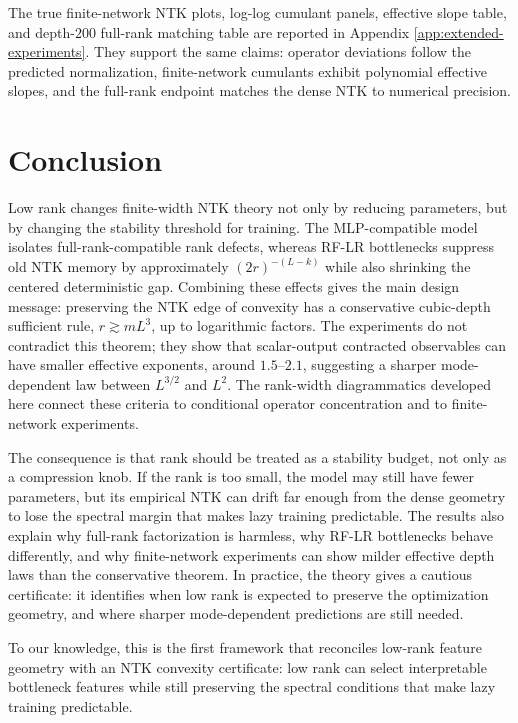 \documentclass{article}
\begin{document}
The true finite-network NTK plots, log-log cumulant panels, effective slope table, and depth-\(200\) full-rank matching table are reported in Appendix \ref{app:extended-experiments}. They support the same claims: operator deviations follow the predicted normalization, finite-network cumulants exhibit polynomial effective slopes, and the full-rank endpoint matches the dense NTK to numerical precision.

\FloatBarrier

\section{Conclusion}
Low rank changes finite-width NTK theory not only by reducing parameters, but by changing the stability threshold for training. The MLP-compatible model isolates full-rank-compatible rank defects, whereas RF-LR bottlenecks suppress old NTK memory by approximately \((2r)^{-(L-k)}\) while also shrinking the centered deterministic gap. Combining these effects gives the main design message: preserving the NTK edge of convexity has a conservative cubic-depth sufficient rule, \(r\gtrsim mL^3\), up to logarithmic factors. The experiments do not contradict this theorem; they show that scalar-output contracted observables can have smaller effective exponents, around \(1.5\)--\(2.1\), suggesting a sharper mode-dependent law between \(L^{3/2}\) and \(L^2\). The rank-width diagrammatics developed here connect these criteria to conditional operator concentration and to finite-network experiments.

The consequence is that rank should be treated as a stability budget, not only as a compression knob. If the rank is too small, the model may still have fewer parameters, but its empirical NTK can drift far enough from the dense geometry to lose the spectral margin that makes lazy training predictable. The results also explain why full-rank factorization is harmless, why RF-LR bottlenecks behave differently, and why finite-network experiments can show milder effective depth laws than the conservative theorem. In practice, the theory gives a cautious certificate: it identifies when low rank is expected to preserve the optimization geometry, and where sharper mode-dependent predictions are still needed.

To our knowledge, this is the first framework that reconciles low-rank feature geometry with an NTK convexity certificate: low rank can select interpretable bottleneck features while still preserving the spectral conditions that make lazy training predictable.
\end{document}
